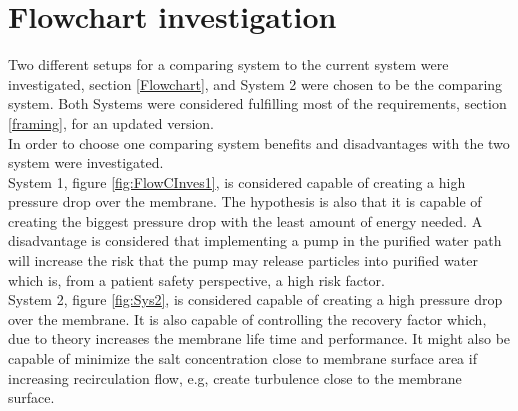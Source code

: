 

\section{Flowchart investigation}
Two different setups for a comparing system to the current system were investigated, section \ref{Flowchart}, and System 2 were chosen to be the comparing system. Both Systems were considered fulfilling most of the requirements, section \ref{framing}, for an updated version. \\

In order to choose one comparing system benefits and disadvantages with the two system were investigated. \\

System 1, figure \ref{fig:FlowCInves1}, is considered capable of creating a high pressure drop over the membrane. The hypothesis is also that it is capable of creating the biggest pressure drop with the least amount of energy needed. A disadvantage is considered  that implementing a pump in the purified water path will increase the risk that the pump may release particles into purified water which is, from a patient safety perspective, a high risk factor. \\

System 2, figure \ref{fig:Sys2}, is considered capable of creating a high pressure drop over the membrane. It is also capable of controlling the recovery factor which, due to theory increases the membrane life time and performance. It might also be capable of minimize the salt concentration close to membrane surface area if increasing recirculation flow, e.g, create turbulence close to the membrane surface. \\


